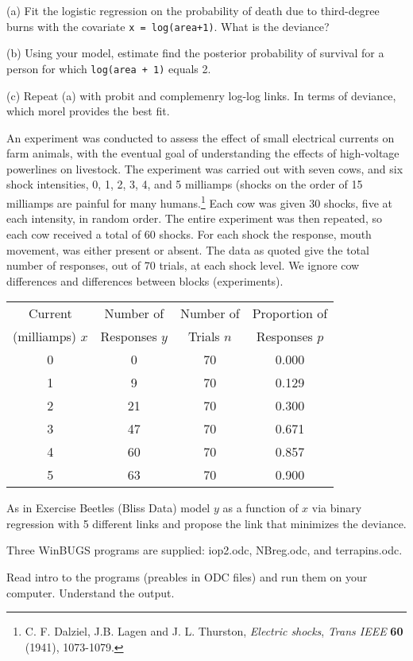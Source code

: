 \documentclass[12pt]{article}
\begin{document}
(a) Fit the logistic
regression on the probability of death due to third-degree burns with
the  covariate {\tt x = log(area+1)}. What is the deviance?


(b) Using your model, estimate find the posterior probability of survival for a person for which {\tt log(area + 1)} equals 2.


(c) Repeat (a) with probit and complemenry log-log links.
In terms of deviance, which morel provides the best fit.

  \vspace*{0.3in}
An experiment was conducted to assess the effect of
small electrical currents on farm animals, with the eventual goal
of understanding the effects of high-voltage powerlines on
livestock.  The experiment was carried out with seven cows, and
six shock intensities, 0, 1, 2, 3, 4, and 5 milliamps (shocks on
the order of 15 milliamps are painful for many humans.\footnote{ C. F.
Dalziel, J.B. Lagen and J. L. Thurston, {\it Electric shocks},
\textit{Trans IEEE} \textbf{60} (1941), 1073-1079. }  Each cow was
given 30 shocks, five at each intensity, in random order.  The
entire experiment was then repeated, so each cow received a total
of 60 shocks.  For each shock the response, mouth movement, was
either present or absent.  The data as quoted give the total
number of responses, out of 70 trials, at each shock level.  We
ignore cow differences and differences between blocks
(experiments).

\begin{center}
  \begin{tabular}{cccc}                                             \hline
    Current         & Number of     & Number of  & Proportion of \\
    (milliamps) $x$ & Responses $y$ & Trials $n$ & Responses $p$ \\ \hline
          0         &       0       &     70     &     0.000     \\
          1         &       9       &     70     &     0.129     \\
          2         &      21       &     70     &     0.300     \\
          3         &      47       &     70     &     0.671     \\
          4         &      60       &     70     &     0.857     \\
          5         &      63       &     70     &     0.900     \\ \hline
  \end{tabular}
\end{center}
As in Exercise Beetles (Bliss Data) model $y$ as a function of $x$ via binary regression with 5 different links and propose the link that minimizes the deviance.

 \vspace*{0.3in}
Three WinBUGS programs are supplied: iop2.odc, NBreg.odc, and 
terrapins.odc.

Read intro to the programs (preables in ODC files) and run them on your computer.
Understand the output.
\end{document}
